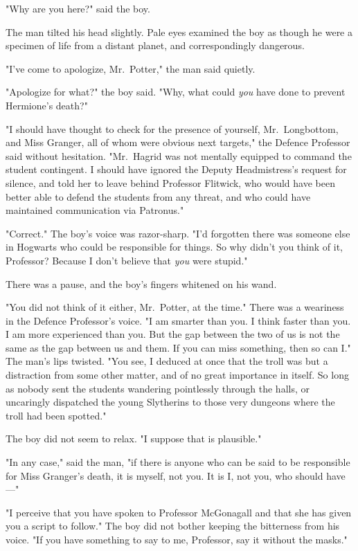 "Why are you here?" said the boy.

The man tilted his head slightly. Pale eyes examined the boy as though he were
a specimen of life from a distant planet, and correspondingly dangerous.

"I've come to apologize, Mr.~Potter," the man said quietly.

"Apologize for what?" the boy said. "Why, what could \emph{you} have done to
prevent Hermione's death?"

"I should have thought to check for the presence of yourself, Mr.~Longbottom,
and Miss Granger, all of whom were obvious next targets," the Defence Professor
said without hesitation. "Mr.~Hagrid was not mentally equipped to command the
student contingent. I should have ignored the Deputy Headmistress's request for
silence, and told her to leave behind Professor Flitwick, who would have been
better able to defend the students from any threat, and who could have
maintained communication via Patronus."

"Correct." The boy's voice was razor-sharp. "I'd forgotten there was someone
else in Hogwarts who could be responsible for things. So why didn't you think
of it, Professor? Because I don't believe that \emph{you} were stupid."

There was a pause, and the boy's fingers whitened on his wand.

"You did not think of it either, Mr.~Potter, at the time." There was a
weariness in the Defence Professor's voice. "I am smarter than you. I think
faster than you. I am more experienced than you. But the gap between the two of
us is not the same as the gap between us and them. If you can miss something,
then so can I." The man's lips twisted. "You see, I deduced at once that the
troll was but a distraction from some other matter, and of no great importance
in itself. So long as nobody sent the students wandering pointlessly through
the halls, or uncaringly dispatched the young Slytherins to those very dungeons
where the troll had been spotted."

The boy did not seem to relax. "I suppose that is plausible."

"In any case," said the man, "if there is anyone who can be said to be
responsible for Miss Granger's death, it is myself, not you. It is I, not you,
who should have---"

"I perceive that you have spoken to Professor McGonagall and that she has given
you a script to follow." The boy did not bother keeping the bitterness from his
voice. "If you have something to say to me, Professor, say it without the
masks."

